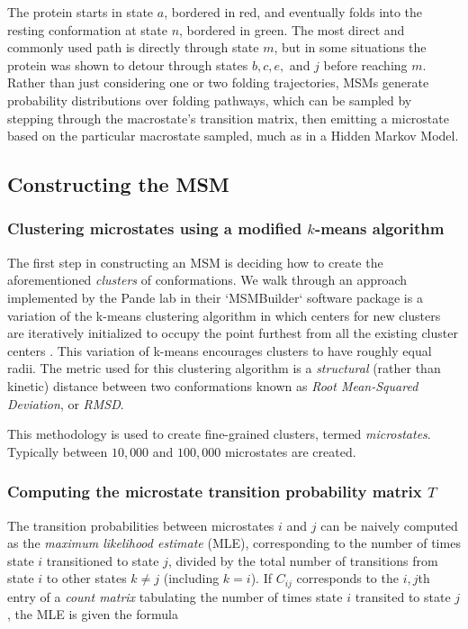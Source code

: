 \documentclass{article}
\begin{document}
The protein starts in state $a$, bordered in red, and eventually folds into the resting conformation at state $n$, bordered in green. The most direct and commonly used path is directly through state $m$, but in some situations the protein was shown to detour through states $b, c, e,$ and $j$ before reaching $m$. Rather than just considering one or two folding trajectories, MSMs generate probability distributions over folding pathways, which can be sampled by stepping through the macrostate's transition matrix, then emitting a microstate based on the particular macrostate sampled, much as in a Hidden Markov Model. 

\subsection{Constructing the MSM}
\subsubsection{Clustering microstates using a modified $k$-means algorithm}
The first step in constructing an MSM is deciding how to create the aforementioned \textit{clusters} of conformations. We walk through an approach implemented by the Pande lab in their `MSMBuilder` \cite{msmbuilder} software package is a variation of the k-means clustering algorithm in which centers for new clusters are iteratively initialized to occupy the point furthest from all the existing cluster centers \cite{pande2009}. This variation of k-means encourages clusters to have roughly equal radii. The metric used for this clustering algorithm is a \textit{structural} (rather than kinetic) distance between two conformations known as \textit{Root Mean-Squared Deviation}, or \textit{RMSD}.

This methodology is used to create fine-grained clusters, termed \textit{microstates}. Typically between $10,000$ and $100,000$ microstates are created. 

\subsubsection{Computing the microstate transition probability matrix $T$}
The transition probabilities between microstates $i$ and $j$ can be naively computed as the \textit{maximum likelihood estimate} (MLE), corresponding to the number of times state $i$ transitioned to state $j$, divided by the total number of transitions from state $i$ to other states $k \neq j$ (including $k=i$). If $C_{ij}$ corresponds to the $i,j$th entry of a \textit{count matrix} tabulating the number of times state $i$ transited to state $j$, the MLE is given the formula
\end{document}

